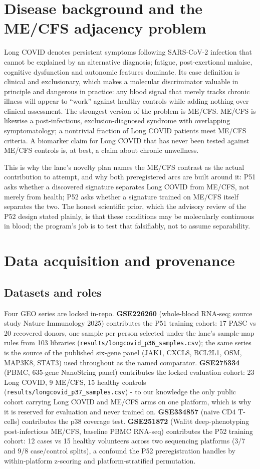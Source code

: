 \documentclass[11pt,a4paper]{article}
\begin{document}
\section{Disease background and the ME/CFS adjacency problem}
Long COVID denotes persistent symptoms following SARS-CoV-2 infection that
cannot be explained by an alternative diagnosis; fatigue, post-exertional
malaise, cognitive dysfunction and autonomic features dominate. Its case
definition is clinical and exclusionary, which makes a molecular discriminator
valuable in principle and dangerous in practice: any blood signal that merely
tracks chronic illness will appear to ``work'' against healthy controls while
adding nothing over clinical assessment. The strongest version of the problem
is ME/CFS. ME/CFS is likewise a post-infectious, exclusion-diagnosed syndrome
with overlapping symptomatology; a nontrivial fraction of Long COVID patients
meet ME/CFS criteria. A biomarker claim for Long COVID that has never been
tested against ME/CFS controls is, at best, a claim about chronic unwellness.

This is why the lane's novelty plan names the ME/CFS contrast as the actual
contribution to attempt, and why both preregistered arcs are built around it:
P51 asks whether a discovered signature separates Long COVID from ME/CFS, not
merely from health; P52 asks whether a signature trained on ME/CFS itself
separates the two. The honest scientific prior, which the advisory review of
the P52 design stated plainly, is that these conditions may be molecularly
continuous in blood; the program's job is to test that falsifiably, not to
assume separability.

\section{Data acquisition and provenance}
\subsection{Datasets and roles}
Four GEO series are locked in-repo. \textbf{GSE226260} (whole-blood RNA-seq;
source study Nature Immunology 2025) contributes the P51 training cohort: 17
PASC vs 20 recovered donors, one sample per person selected under the lane's
sample-map rules from 103 libraries (\texttt{results/longcovid\_p36\_samples.csv});
the same series is the source of the published six-gene panel (JAK1, CXCL8,
BCL2L1, OSM, MAP3K8, STAT3) used throughout as the named comparator.
\textbf{GSE275334} (PBMC, 635-gene NanoString panel) contributes the locked
evaluation cohort: 23 Long COVID, 9 ME/CFS, 15 healthy controls
(\texttt{results/longcovid\_p37\_samples.csv}) - to our knowledge the only
public cohort carrying Long COVID and ME/CFS arms on one platform, which is
why it is reserved for evaluation and never trained on. \textbf{GSE334857}
(naive CD4 T-cells) contributes the p38 coverage test. \textbf{GSE251872}
(Walitt deep-phenotyping post-infectious ME/CFS, baseline PBMC RNA-seq)
contributes the P52 training cohort: 12 cases vs 15 healthy volunteers across
two sequencing platforms (3/7 and 9/8 case/control splits), a confound the
P52 preregistration handles by within-platform z-scoring and
platform-stratified permutation.
\end{document}
